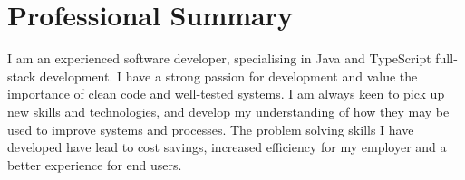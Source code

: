 \section{Professional Summary}\label{sec:professional-summary}
I am an experienced software developer, specialising in Java and TypeScript full-stack development.
I have a strong passion for development and value the importance of clean code and well-tested systems.
I am always keen to pick up new skills and technologies, and develop my understanding of how they may be used to improve systems and processes.
The problem solving skills I have developed have lead to cost savings, increased efficiency for my employer and a better experience for end users.